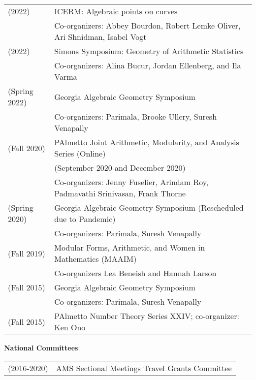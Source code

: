 \documentclass[margin,line]{res}
\newcommand{\defi}[1]{\textsf{#1}} 				%
\begin{document}
\begin{resume}
  \begin{tabular}{ll}
    (2022) & \defi{ICERM: Algebraic points on curves} \\
  & Co-organizers: Abbey Bourdon, Robert Lemke Oliver, Ari Shnidman, Isabel Vogt \\        
  (2022) & \defi{Simons Symposium: Geometry of Arithmetic Statistics} \\
  & Co-organizers: Alina Bucur, Jordan Ellenberg, and Ila Varma \\    
  (Spring 2022) & \defi{Georgia Algebraic Geometry Symposium}\\
               & Co-organizers: Parimala, Brooke Ullery, Suresh Venapally   \\
  (Fall 2020) & \defi{PAlmetto Joint Arithmetic, Modularity, and Analysis Series} (Online)\\
               & (September 2020 and December 2020)\\
               & Co-organizers: Jenny Fuselier, Arindam Roy, Padmavathi Srinivasan, Frank Thorne \\
(Spring 2020) & \defi{Georgia Algebraic Geometry Symposium} (Rescheduled due to Pandemic) \\
               & Co-organizers: Parimala, Suresh Venapally   \\
  (Fall 2019) & \defi{Modular Forms, Arithmetic, and Women in Mathematics} (MAAIM) \\
               & Co-organizers Lea Beneish and Hannah Larson \\  
  (Fall 2015) & \defi{Georgia Algebraic Geometry Symposium} \\
               &  Co-organizers: Parimala, Suresh Venapally   \\
 (Fall 2015) & \defi{PAlmetto Number Theory Series XXIV}; co-organizer: Ken Ono  \\
\end{tabular}

\textbf{National Committees}: 
  \vspace*{-.15in}
  
\begin{tabular}{ll}
(2016-2020) & AMS Sectional Meetings Travel Grants Committee \\
\end{tabular}


\end{resume}
\end{document}
